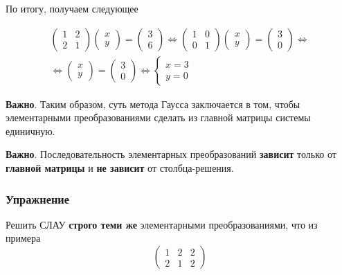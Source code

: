 \documentclass[]{article}
\begin{document}
По итогу, получаем следующее

\begin{gather*}
\begin{pmatrix}
		1 & 2
		\\
		2 & 1
\end{pmatrix}
\begin{pmatrix}
	x
	\\
	y 
\end{pmatrix}
=
\begin{pmatrix}
	3
	\\
	6 
\end{pmatrix}
\Leftrightarrow
\begin{pmatrix}
	1 & 0 
	\\
	0 & 1 
\end{pmatrix}
\begin{pmatrix}
	x
	\\
	y 
\end{pmatrix}
=
\begin{pmatrix}
	3
	\\
	0 
\end{pmatrix}
\Leftrightarrow
\\
\Leftrightarrow
\begin{pmatrix}
	x
	\\
	y 
\end{pmatrix}
=
\begin{pmatrix}
	3
	\\
	0 
\end{pmatrix}
\Leftrightarrow
\begin{cases}
	x=3
	\\
	y=0
\end{cases}
\end{gather*}


\textbf{Важно}. Таким образом, суть метода Гаусса заключается в том, чтобы элементарными преобразованиями сделать из главной матрицы системы единичную.

\textbf{Важно}. Последовательность элементарных преобразований \textbf{зависит} только от \textbf{главной матрицы} и \textbf{не зависит} от столбца-решения.

\subsubsection{Упражнение}
Решить СЛАУ \textbf{строго теми же} элементарными преобразованиями, что из примера
\begin{equation*}
		\left(
	\begin{array}{ll|l}
		1 & 2 & 2
		\\
		2 & 1 & 2
	\end{array}
	\right)
\end{equation*}
\end{document}
